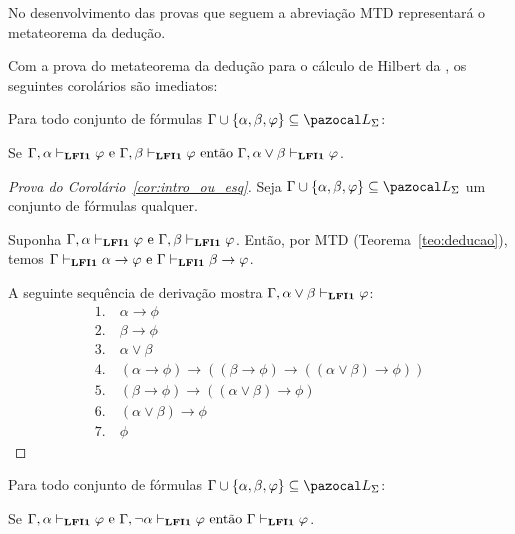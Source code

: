     No desenvolvimento das provas que seguem a abreviação MTD representará o metateorema da dedução.
    
    Com a prova do metateorema da dedução para o cálculo de Hilbert da \lfium{}, os seguintes corolários são imediatos:

    \begin{corolario}\label{cor:intro_ou_esq}
        Para todo conjunto de fórmulas $\Gamma \cup \{\alpha, \beta, \phi\} \subseteq \ling{}$:

        \centering
        {\normalfont{}Se $\Gamma, \alpha \vdash_{{\normalfont\textbf{LFI1}}{}} \varphi \text{ e }\Gamma, \beta \vdash_{{\normalfont\textbf{LFI1}}{}} \varphi \text{ então } \Gamma, \alpha \lor \beta \vdash_{{\normalfont\textbf{LFI1}}{}} \varphi$.}
    \end{corolario}

    \begin{proof}[Prova do Corolário~\ref{cor:intro_ou_esq}]
        Seja $\Gamma \cup \{\alpha, \beta, \phi\} \subseteq \ling{}$ um conjunto de fórmulas qualquer.
        
        Suponha $\Gamma, \alpha \vdash_{{\normalfont\textbf{LFI1}}{}} \varphi \text{ e }\Gamma, \beta \vdash_{{\normalfont\textbf{LFI1}}{}} \varphi$. 
        Então, por MTD (Teorema~\ref{teo:deducao}), temos $\Gamma \vdash_{{\normalfont\textbf{LFI1}}{}} \alpha \to \varphi \text{ e }\Gamma \vdash_{{\normalfont\textbf{LFI1}}{}} \beta \to \varphi$.

        A seguinte sequência de derivação mostra $\Gamma, \alpha \lor \beta \vdash_{{\normalfont\textbf{LFI1}}{}} \varphi$:
        \begin{align*}
            1. ~& \alpha \to \phi \tag{MTD aplicado à suposição} \\
            2. ~& \beta \to \phi \tag{MTD aplicado à suposição} \\
            3. ~& \alpha \lor \beta \tag{Premissa} \\
            4. ~& (\alpha \to \phi) \to ((\beta \to \phi) \to ((\alpha \lor \beta) \to \phi)) \tag{Ax8} \\
            5. ~& (\beta \to \phi) \to ((\alpha \lor \beta) \to \phi) \tag{MP 1, 4}\\
            6. ~& (\alpha \lor \beta) \to \phi \tag{MP 2, 5} \\
            7. ~& \phi \tag{MP 3, 6}
        \end{align*}
    \end{proof}


    \begin{corolario}\label{cor:prova_por_casos}
        Para todo conjunto de fórmulas $\Gamma \cup \{\alpha, \beta, \phi\} \subseteq \ling{}$:

        \centering
        {\normalfont{}Se $\Gamma, \alpha \vdash_{{\normalfont\textbf{LFI1}}{}} \varphi \text{ e }\Gamma, \neg\alpha \vdash_{{\normalfont\textbf{LFI1}}{}} \varphi \text{ então } \Gamma \vdash_{{\normalfont\textbf{LFI1}}{}} \varphi$.}
    \end{corolario}


